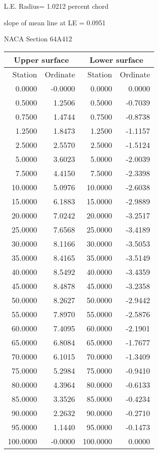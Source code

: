 \documentclass[11pt]{book}
\begin{document}
L.E. Radius=  1.0212 percent chord


 slope of mean line at LE =  0.0951
 \newpage
  \label{s64A412}
 \begin{Large}
 NACA Section 64A412
 \end{Large}
  
 \vspace{8mm}
 \begin{tabular}{|r|r|r|r|} \hline 
 \multicolumn{2}{|c|}{Upper surface} & \multicolumn{2}{|c|}{Lower surface} \\
 \hline
 Station & Ordinate & Station & Ordinate \\
 \hline
0.0000 & -0.0000 & 0.0000 & 0.0000 \\
0.5000 & 1.2506 & 0.5000 & -0.7039 \\
0.7500 & 1.4744 & 0.7500 & -0.8738 \\
1.2500 & 1.8473 & 1.2500 & -1.1157 \\
2.5000 & 2.5570 & 2.5000 & -1.5124 \\
5.0000 & 3.6023 & 5.0000 & -2.0039 \\
7.5000 & 4.4150 & 7.5000 & -2.3398 \\
10.0000 & 5.0976 & 10.0000 & -2.6038 \\
15.0000 & 6.1883 & 15.0000 & -2.9889 \\
20.0000 & 7.0242 & 20.0000 & -3.2517 \\
25.0000 & 7.6568 & 25.0000 & -3.4189 \\
30.0000 & 8.1166 & 30.0000 & -3.5053 \\
35.0000 & 8.4165 & 35.0000 & -3.5149 \\
40.0000 & 8.5492 & 40.0000 & -3.4359 \\
45.0000 & 8.4878 & 45.0000 & -3.2358 \\
50.0000 & 8.2627 & 50.0000 & -2.9442 \\
55.0000 & 7.8970 & 55.0000 & -2.5876 \\
60.0000 & 7.4095 & 60.0000 & -2.1901 \\
65.0000 & 6.8084 & 65.0000 & -1.7677 \\
70.0000 & 6.1015 & 70.0000 & -1.3409 \\
75.0000 & 5.2984 & 75.0000 & -0.9410 \\
80.0000 & 4.3964 & 80.0000 & -0.6133 \\
85.0000 & 3.3526 & 85.0000 & -0.4234 \\
90.0000 & 2.2632 & 90.0000 & -0.2710 \\
95.0000 & 1.1440 & 95.0000 & -0.1473 \\
100.0000 & -0.0000 & 100.0000 & 0.0000 \\
 \hline 
 \end{tabular}
\end{document}
